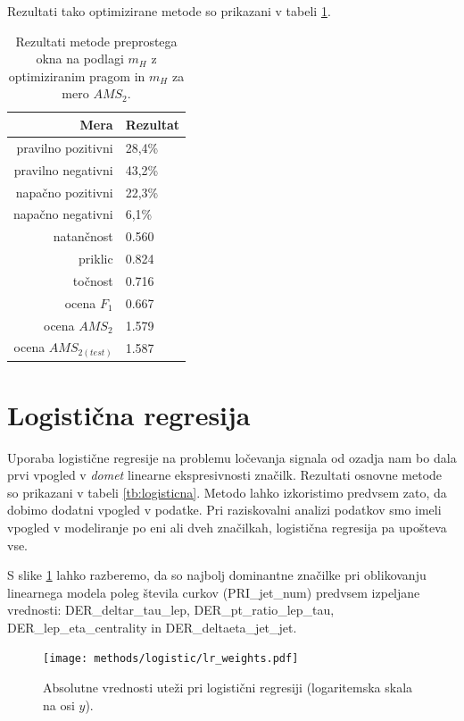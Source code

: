 \documentclass[11pt,a4paper,openany]{book}
\begin{document}
Rezultati tako optimizirane metode so prikazani v tabeli \ref{tb:preprosto_okno_2d_optimized}.

\begin{table}[ht]
	\centering
	\begin{tabular}{rl}
		\hline
		\textbf{Mera} & \textbf{Rezultat} \\
		\hline
		pravilno pozitivni & 28,4\%\\
		pravilno negativni & 43,2\% \\
		napačno pozitivni & 22,3\% \\
		napačno negativni & 6,1\% \\
		natančnost & 0.560 \\
		priklic & 0.824 \\
		točnost & 0.716 \\
		ocena $F_1$ & 0.667 \\
		ocena $AMS_2$ & 1.579 \\
		ocena $AMS_{2(test)}$ & 1.587 		
	\end{tabular}
	\caption{Rezultati metode preprostega okna na podlagi $m_H$ z optimiziranim pragom in $m_H$ za mero $AMS_2$.}
	\label{tb:preprosto_okno_2d_optimized}
\end{table}

\section{Logistična regresija}
Uporaba logistične regresije na problemu ločevanja signala od ozadja nam bo dala prvi vpogled v \textit{domet} linearne ekspresivnosti značilk. Rezultati osnovne metode so prikazani v tabeli \ref{tb:logisticna}. Metodo lahko izkoristimo predvsem zato, da dobimo dodatni vpogled v podatke. Pri raziskovalni analizi podatkov smo imeli vpogled v modeliranje po eni ali dveh značilkah, logistična regresija pa upošteva vse. 

S slike \ref{sl:logistic_weights} lahko razberemo, da so najbolj dominantne značilke pri oblikovanju linearnega modela poleg števila curkov (PRI\_jet\_num) predvsem izpeljane vrednosti: DER\_deltar\_tau\_lep, DER\_pt\_ratio\_lep\_tau, DER\_lep\_eta\_centrality in DER\_deltaeta\_jet\_jet.

\begin{figure}[h]
	\centering	
	\texttt{[image: methods/logistic/lr\_weights.pdf]}
	
	\caption{Absolutne vrednosti uteži pri logistični regresiji (logaritemska skala na osi $y$).}
	\label{sl:logistic_weights}
\end{figure}
\end{document}

